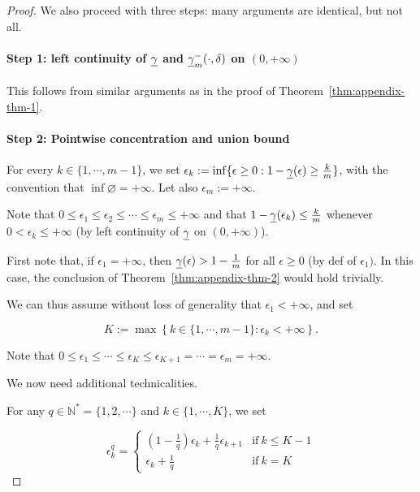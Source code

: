     \begin{proof}
    We also proceed with three steps: many arguments are identical, but not all.

    \paragraph{Step 1: left continuity of $\underline{\gamma}$ and $\underline{\gamma}_{m}^{-}(\cdot, \delta)$ on $(0,+\infty)$} This follows from similar arguments as in the proof of Theorem~\ref{thm:appendix-thm-1}.

    \paragraph{Step 2: Pointwise concentration and union bound}
    For every $k \in \{1,\cdots,m-1\}$, we set $\epsilon_k := \inf \{ \epsilon \geq 0 : 1 - \underline{\gamma}(\epsilon) \geq \frac{k}{m}\}$, with the convention that $\inf \varnothing = + \infty$. Let also $\epsilon_m := + \infty$.
    
    Note that $0 \leq \epsilon_1 \leq \epsilon_2 \leq \cdots \leq \epsilon_m \leq +\infty$ and that $1-\underline{\gamma}(\epsilon_k) \leq \frac{k}{m}$ whenever $0 < \epsilon_k \leq +\infty$ (by left continuity of $\underline{\gamma}$ on $(0,+\infty)$).

    First note that, if $\epsilon_1=+\infty$, then $\underline{\gamma}(\epsilon) > 1 - \frac{1}{m}$ for all $\epsilon \geq 0$ (by def of $\epsilon_1)$. In this case, the conclusion of Theorem~\ref{thm:appendix-thm-2} would hold trivially.

    We can thus assume without loss of generality that $\epsilon_1 < +\infty$, and set 

    $$
        K:= \max\left\{k\in\{1,\cdots,m-1\}: \epsilon_k < +\infty \right\}.
    $$

    Note that $0 \leq \epsilon_1 \leq \cdots \leq \epsilon_K \leq \epsilon_{K+1} = \cdots = \epsilon_m = + \infty$.

    We now need additional technicalities.

    For any $q \in \mathbb{N}^* = \{1, 2, \cdots\}$ and $k \in \{1,\cdots,K\}$, we set

    \begin{equation*}
        \epsilon_k^q = \begin{cases}
            \left(1-\frac{1}{q}\right) \epsilon_k + \frac{1}{q}\epsilon_{k+1} & \text{if} \ k \leq K-1 \\
            \epsilon_k + \frac{1}{q} & \text{if} \ k = K
        \end{cases}
    \end{equation*}


\end{proof}
